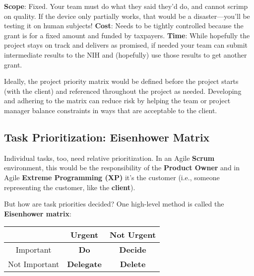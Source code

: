 \textbf{Scope}: Fixed. Your team must do what they said they'd do, and cannot scrimp on quality. If the device only partially works, that would be a disaster---you'll be testing it on human subjects! \textbf{Cost}: Needs to be tightly controlled because the grant is for a fixed amount and funded by taxpayers. \textbf{Time}: While hopefully the project stays on track and delivers as promised, if needed your team can submit intermediate results to the NIH and (hopefully) use those results to get another grant.

Ideally, the project priority matrix would be defined before the project starts (with the client) and referenced throughout the project as needed. Developing and adhering to the matrix can reduce risk by helping the team or project manager balance constraints in ways that are acceptable to the client.

\subsection{Task Prioritization: Eisenhower Matrix}

Individual tasks, too, need relative prioritization. In an Agile \textbf{Scrum} environment, this would be the responsibility of the \textbf{Product Owner} and in Agile \textbf{Extreme Programming (XP)} it's the customer (i.e., someone representing the customer, like the \textbf{client}). 

But how are task priorities decided? One high-level method is called the \textbf{Eisenhower matrix}:

\begin{center}
\begin{tabular}{c|c|c}
    & Urgent & Not Urgent \\
    \hline
    Important & \textbf{Do} & \textbf{Decide} \\
    \hline
    Not Important & \textbf{Delegate} & \textbf{Delete}
\end{tabular}
\end{center}

